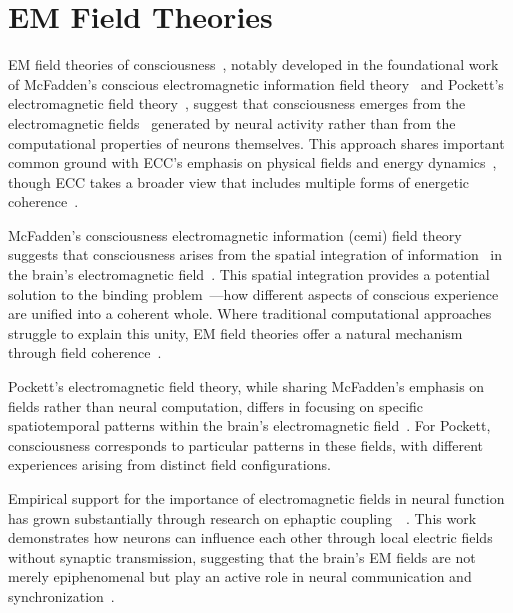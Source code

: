 \section{EM Field Theories}

EM field theories of consciousness~, notably developed in the foundational work of McFadden's conscious electromagnetic information field theory~\cite{McFadden2002, McFadden2020} and Pockett's electromagnetic field theory~\cite{Pockett2000}, suggest that consciousness emerges from the electromagnetic fields~ generated by neural activity rather than from the computational properties of neurons themselves. This approach shares important common ground with ECC's emphasis on physical fields and energy dynamics~, though ECC takes a broader view that includes multiple forms of energetic coherence~.

McFadden's consciousness electromagnetic information (cemi) field theory suggests that consciousness arises from the spatial integration of information~ in the brain's electromagnetic field~\cite{McFadden2002, McFadden2020}. This spatial integration provides a potential solution to the binding problem~—how different aspects of conscious experience are unified into a coherent whole. Where traditional computational approaches struggle to explain this unity, EM field theories offer a natural mechanism through field coherence~.

Pockett's electromagnetic field theory, while sharing McFadden's emphasis on fields rather than neural computation, differs in focusing on specific spatiotemporal patterns within the brain's electromagnetic field~\cite{Pockett2000, Pockett2012}. For Pockett, consciousness corresponds to particular patterns in these fields, with different experiences arising from distinct field configurations.

Empirical support for the importance of electromagnetic fields in neural function has grown substantially through research on ephaptic coupling~~\cite{Radman2007, anastassiou2015ephaptic}. This work demonstrates how neurons can influence each other through local electric fields without synaptic transmission, suggesting that the brain's EM fields are not merely epiphenomenal but play an active role in neural communication and synchronization~.

